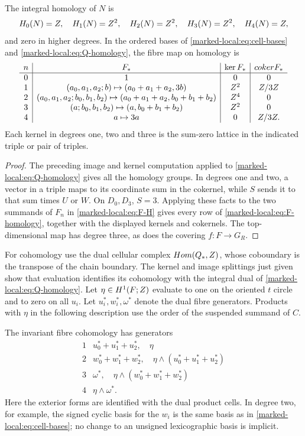 \begin{theorem}\label{marked-local:thm:homology}
The integral homology of $N$ is
\[
 H_0(N)=Z,\quad H_1(N)=Z^2,\quad H_2(N)=Z^2,
 \quad H_3(N)=Z^2,\quad H_4(N)=Z,
\]
and zero in higher degrees. In the ordered bases of
\eqref{marked-local:eq:cell-bases} and \eqref{marked-local:eq:Q-homology}, the fibre map on
homology is
\begin{equation}\label{marked-local:eq:F-homology}
\begin{array}{c|c|c|c}
 n&F_*&\ker F_*&coker F_*\\ \hline
 0&1&0&0\\
 1&(a_0,a_1,a_2;b)\mapsto(a_0+a_1+a_2,3b)&Z^2&Z/3Z\\
 2&(a_0,a_1,a_2;b_0,b_1,b_2)\mapsto
       (a_0+a_1+a_2,b_0+b_1+b_2)&Z^4&0\\
 3&(a;b_0,b_1,b_2)\mapsto(a,b_0+b_1+b_2)&Z^2&0\\
 4&a\mapsto3a&0&Z/3Z.
\end{array}
\end{equation}
Each kernel in degrees one, two and three is the sum-zero lattice
in the indicated triple or pair of triples.
\end{theorem}
\begin{proof}
The preceding image and kernel computation applied to
\eqref{marked-local:eq:Q-homology} gives all the homology groups.
In degrees one and two, a vector in a triple maps to its coordinate
sum in the cokernel, while $S$ sends it to that sum times $U$ or $W$.
On $D_0,D_3$, $S=3$. Applying these facts to the two summands
of $F_n$ in \eqref{marked-local:eq:F-H} gives every row of
\eqref{marked-local:eq:F-homology}, together with the displayed kernels and
cokernels. The top-dimensional map has degree three, as does the
covering $f:F\to G_R$.
\end{proof}

For cohomology use the dual cellular complex
$Hom(Q_*,Z)$, whose coboundary is the transpose of
the chain boundary. The kernel and image splittings just given show
that evaluation identifies its cohomology with the integral dual of
\eqref{marked-local:eq:Q-homology}. Let $\eta\in H^1(F;Z)$ evaluate to one
on the oriented $t$ circle and to zero on all $u_i$.
Let $u_i^*,w_i^*,\omega^*$ denote
the dual fibre generators. Products with $\eta$ in the following
description use the order of the suspended summand of $C$.

The invariant fibre cohomology has generators
\[
\begin{array}{c|c}
 1&u_0^*+u_1^*+u_2^*,\quad\eta\\
 2&w_0^*+w_1^*+w_2^*,\quad
       \eta\wedge(u_0^*+u_1^*+u_2^*)\\
 3&\omega^*,\quad\eta\wedge(w_0^*+w_1^*+w_2^*)\\
 4&\eta\wedge\omega^*.
\end{array}
\]
Here the exterior forms are identified with the dual product cells.
In degree two, for example, the signed cyclic basis for the $w_i$
is the same basis as in \eqref{marked-local:eq:cell-bases}; no change to an
unsigned lexicographic basis is implicit.

